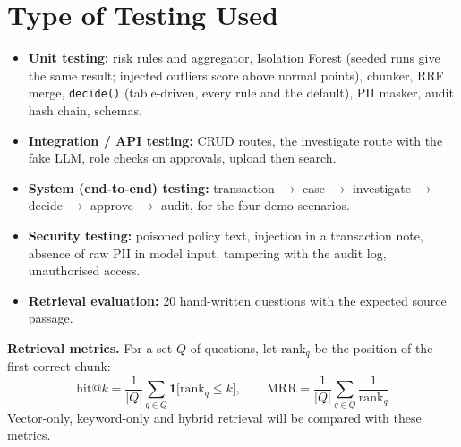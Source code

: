 \documentclass[oneside,a4paper,12pt]{report}
\begin{document}
\section{Type of Testing Used}
\begin{itemize}
  \item \textbf{Unit testing:} risk rules and aggregator, Isolation Forest (seeded runs give the same result; injected outliers score above normal points), chunker, RRF merge, \texttt{decide()} (table-driven, every rule and the default), PII masker, audit hash chain, schemas.
  \item \textbf{Integration / API testing:} CRUD routes, the investigate route with the fake LLM, role checks on approvals, upload then search.
  \item \textbf{System (end-to-end) testing:} transaction $\rightarrow$ case $\rightarrow$ investigate $\rightarrow$ decide $\rightarrow$ approve $\rightarrow$ audit, for the four demo scenarios.
  \item \textbf{Security testing:} poisoned policy text, injection in a transaction note, absence of raw PII in model input, tampering with the audit log, unauthorised access.
  \item \textbf{Retrieval evaluation:} 20 hand-written questions with the expected source passage.
\end{itemize}

\textbf{Retrieval metrics.} For a set $Q$ of questions, let $\mathrm{rank}_q$ be the position of the first correct chunk:
\begin{equation}
  \mathrm{hit@}k = \frac{1}{|Q|}\sum_{q \in Q} \mathbf{1}\bigl[\mathrm{rank}_q \le k\bigr], \qquad
  \mathrm{MRR} = \frac{1}{|Q|}\sum_{q \in Q} \frac{1}{\mathrm{rank}_q}
\end{equation}
Vector-only, keyword-only and hybrid retrieval will be compared with these metrics.
\end{document}
